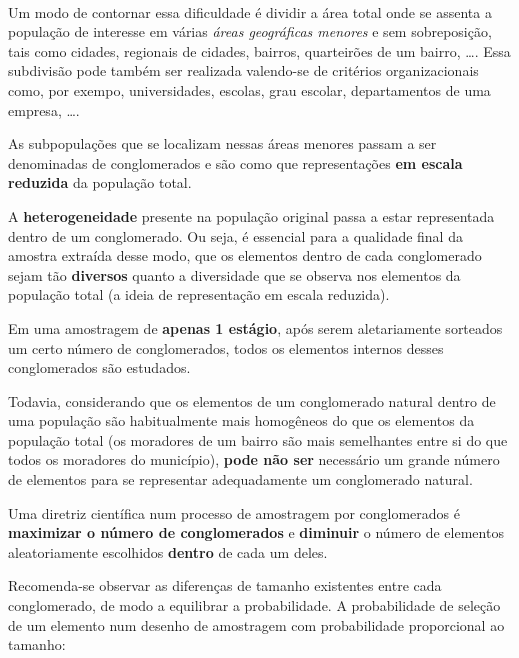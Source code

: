 \documentclass[
]{book}
\begin{document}
~

Um modo de contornar essa dificuldade é dividir a área total onde se assenta a população de interesse em várias \emph{áreas geográficas menores} e sem sobreposição, tais como cidades, regionais de cidades, bairros, quarteirões de um bairro, \ldots. Essa subdivisão pode também ser realizada valendo-se de critérios organizacionais como, por exempo, universidades, escolas, grau escolar, departamentos de uma empresa, \ldots.

\hfill\break

As subpopulações que se localizam nessas áreas menores passam a ser denominadas de conglomerados e são como que representações \textbf{em escala reduzida} da população total.

\hfill\break

A \textbf{heterogeneidade} presente na população original passa a estar representada dentro de um conglomerado. Ou seja, é essencial para a qualidade final da amostra extraída desse modo, que os elementos dentro de cada conglomerado sejam tão \textbf{diversos} quanto a diversidade que se observa nos elementos da população total (a ideia de representação em escala reduzida).

\hfill\break

Em uma amostragem de \textbf{apenas 1 estágio}, após serem aletariamente sorteados um certo número de conglomerados, todos os elementos internos desses conglomerados são estudados.

\hfill\break

Todavia, considerando que os elementos de um conglomerado natural dentro de uma população são habitualmente mais homogêneos do que os elementos da população total (os moradores de um bairro são mais semelhantes entre si do que todos os moradores do município), \textbf{pode não ser} necessário um grande número de elementos para se representar adequadamente um conglomerado natural.

\hfill\break

Uma diretriz científica num processo de amostragem por conglomerados é \textbf{maximizar o número de conglomerados} e \textbf{diminuir} o número de elementos aleatoriamente escolhidos \textbf{dentro} de cada um deles.

\hfill\break

Recomenda-se observar as diferenças de tamanho existentes entre cada conglomerado, de modo a equilibrar a probabilidade. A probabilidade de seleção de um elemento num desenho de amostragem com probabilidade proporcional ao tamanho:
\end{document}
